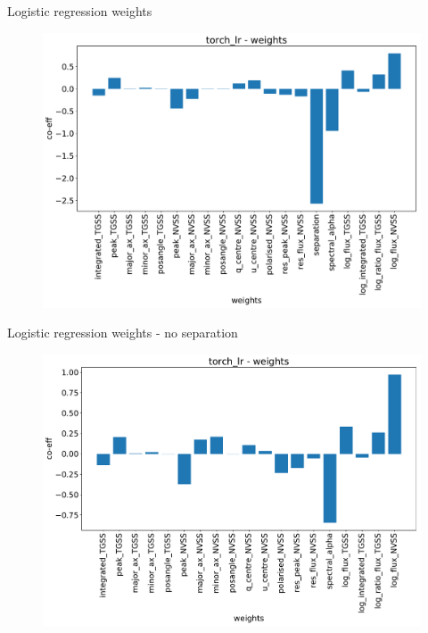 \documentclass[12pt]{beamer}
\begin{document}
\begin{frame}{Logistic regression weights}
\begin{figure}
\includegraphics[width=\textwidth]{pics/torch_lr_weights.pdf}
\end{figure}
\end{frame}

\begin{frame}{Logistic regression weights - no separation}
\begin{figure}
\includegraphics[width=\textwidth]{pics/torch_lr_weights_nosep.pdf}
\end{figure}
\end{frame}
\end{document}
